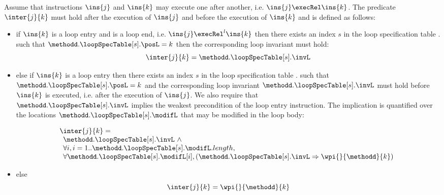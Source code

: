 \begin{defInter}\label{inter} 
Assume that instructions $\ins{j} $ and $\ins{k}$ may execute one after another, i.e. $\ins{j} \execRel \ins{k}$. 
The predicate $\inter{j}{k}$ must hold after the execution of $\ins{j}$ and before the execution of 
$\ins{k}$ and is defined as follows:
\begin{itemize}
\item if $\ins{k}$ is a loop entry and   is a loop end, i.e. $\ins{j} \execRel^l \ins{k}$ then there exists
an index $s$ in the loop specification table  \methodd.\loopSpecTable{} such that  $ \methodd.\loopSpecTable[s].\posL = k $
then the corresponding loop invariant  must hold:
$$
\inter{j}{k} = \methodd.\loopSpecTable[s].\invL
$$


\item else if $\ins{k}$  is a loop entry then there exists
an index $s$ in the loop specification table  \methodd.\loopSpecTable{} such that $ \methodd.\loopSpecTable[s].\posL = k $ 
and the corresponding loop invariant $ \methodd.\loopSpecTable[s].\invL$  must hold before $\ins{k}$ is executed, 
i.e. after the execution of $\ins{j}$. We also require that \\
$\methodd.\loopSpecTable[s].\invL$ implies the weakest precondition of the loop entry instruction. 
The implication is quantified over the locations $ \methodd.\loopSpecTable[s].\modifL $ that may be modified in the loop body:

$$\begin{array}{l} \inter{j}{k} = \\ \begin{array}{l}
          \methodd.\loopSpecTable[s].\invL \ \wedge \\
          \forall i , i = 1.. \methodd.\loopSpecTable[s].\modifL.length ,\\
          \forall  \methodd.\loopSpecTable[s].\modifL[i], (
	           \methodd.\loopSpecTable[s].\invL \Rightarrow   \wpi{ }{ \methodd }{k} ) 
 \end{array}
 \end{array}  $$

\item else 
$$\inter{j}{k} = \wpi{ }{\methodd}{k}$$
\end{itemize}
\end{defInter}
